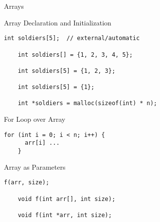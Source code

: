 \begin{frame}{}
  \centerline{\LARGE Arrays}
\end{frame}

\begin{frame}[fragile]{Array Declaration and Initialization}
  \begin{lstlisting}[style = Cstyle]
    int soldiers[5];  // external/automatic

    int soldiers[] = {1, 2, 3, 4, 5};

    int soldiers[5] = {1, 2, 3};
    
    int soldiers[5] = {1};

    int *soldiers = malloc(sizeof(int) * n);
  \end{lstlisting}
\end{frame}

\begin{frame}[fragile]{For Loop over Array}
  \begin{lstlisting}[style = Cstyle]
    for (int i = 0; i < n; i++) {
      arr[i] ...
    }
  \end{lstlisting}
\end{frame}

\begin{frame}[fragile]{Array as Parameters}
  \begin{lstlisting}[style = Cstyle]
    f(arr, size);

    void f(int arr[], int size);

    void f(int *arr, int size);
  \end{lstlisting}
\end{frame}
